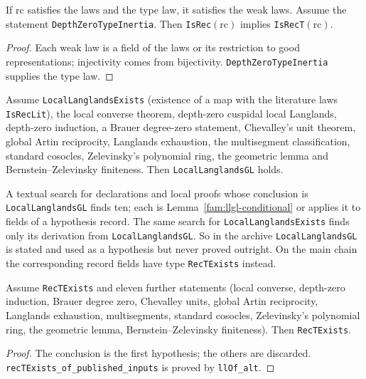 \begin{lemma}\label{fam:isrect-of-isrec}
If $\mathrm{rc}$ satisfies the laws and the type law, it satisfies the weak laws. Assume the statement \texttt{DepthZeroTypeInertia}. Then \texttt{IsRec}$(\mathrm{rc})$ implies \texttt{IsRecT}$(\mathrm{rc})$.
\end{lemma}
\begin{proof}
Each weak law is a field of the laws or its restriction to good representations; injectivity comes from bijectivity. \texttt{DepthZeroTypeInertia} supplies the type law.
\end{proof}

\begin{lemma}\label{fam:llgl-conditional}
Assume \texttt{LocalLanglandsExists} (existence of a map with the literature laws \texttt{IsRecLit}), the local converse theorem, depth-zero cuspidal local Langlands, depth-zero induction, a Brauer degree-zero statement, Chevalley's unit theorem, global Artin reciprocity, Langlands exhaustion, the multisegment classification, standard cosocles, Zelevinsky's polynomial ring, the geometric lemma and Bernstein--Zelevinsky finiteness. Then \texttt{LocalLanglandsGL} holds.
\end{lemma}

\begin{remark}\label{fam:rem-llgl}
A textual search for declarations and local proofs whose conclusion is \texttt{LocalLanglandsGL} finds ten; each is Lemma~\ref{fam:llgl-conditional} or applies it to fields of a hypothesis record. The same search for \texttt{LocalLanglandsExists} finds only its derivation from \texttt{LocalLanglandsGL}. So in the archive \texttt{LocalLanglandsGL} is stated and used as a hypothesis but never proved outright. On the main chain the corresponding record fields have type \texttt{RecTExists} instead.
\end{remark}

\begin{lemma}\label{fam:ll-of-alt}
Assume \texttt{RecTExists} and eleven further statements (local converse, depth-zero induction, Brauer degree zero, Chevalley units, global Artin reciprocity, Langlands exhaustion, multisegments, standard cosocles, Zelevinsky's polynomial ring, the geometric lemma, Bernstein--Zelevinsky finiteness). Then \texttt{RecTExists}.
\end{lemma}
\begin{proof}
The conclusion is the first hypothesis; the others are discarded. \texttt{recTExists\_of\_published\_inputs} is proved by \texttt{llOf\_alt}.
\end{proof}

